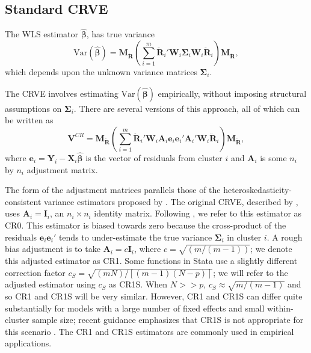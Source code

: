 \documentclass[12pt]{article}
\begin{document}
\hypertarget{standard-crve}{%
\subsection{Standard CRVE}\label{standard-crve}}

The WLS estimator \(\boldsymbol{\hat\beta}\), has true variance
\begin{equation}
\label{eq:var_WLS}
\text{Var}\left(\boldsymbol{\hat\beta}\right) = \mathbf{M_{\ddot{R}}}\left(\sum_{i=1}^m \mathbf{\ddot{R}}_i' \mathbf{W}_i \boldsymbol\Sigma_i \mathbf{W}_i\mathbf{\ddot{R}}_i\right) \mathbf{M_{\ddot{R}}},
\end{equation} which depends upon the unknown variance matrices
\(\boldsymbol\Sigma_i\).

The CRVE involves estimating
\(\text{Var}\left(\boldsymbol{\hat\beta}\right)\) empirically, without
imposing structural assumptions on \(\boldsymbol\Sigma_i\). There are
several versions of this approach, all of which can be written as
\begin{equation}
\label{eq:V_small}
\mathbf{V}^{CR} = \mathbf{M_{\ddot{R}}}\left(\sum_{i=1}^m \mathbf{\ddot{R}}_i'\mathbf{W}_i \mathbf{A}_i \mathbf{e}_i \mathbf{e}_i' \mathbf{A}_i' \mathbf{W}_i \mathbf{\ddot{R}}_i\right) \mathbf{M_{\ddot{R}}},
\end{equation} where
\(\mathbf{e}_i = \mathbf{Y}_i - \mathbf{X}_i \boldsymbol{\hat\beta}\) is
the vector of residuals from cluster \(i\) and \(\mathbf{A}_i\) is some
\(n_i\) by \(n_i\) adjustment matrix.

The form of the adjustment matrices parallels those of the
heteroskedasticity-consistent variance estimators proposed by
\citet{MacKinnon1985some}. The original CRVE, described by
\citet{Liang1986longitudinal}, uses \(\mathbf{A}_i = \mathbf{I}_i\), an
\(n_i \times n_i\) identity matrix. Following
\citet{Cameron2015practitioners}, we refer to this estimator as CR0.
This estimator is biased towards zero because the cross-product of the
residuals \(\mathbf{e}_i \mathbf{e}_i'\) tends to under-estimate the
true variance \(\boldsymbol\Sigma_i\) in cluster \(i\). A rough bias
adjustment is to take \(\mathbf{A}_i = c\mathbf{I}_i\), where
\(c = \sqrt{(m/(m-1))}\); we denote this adjusted estimator as CR1. Some
functions in Stata use a slightly different correction factor
\(c_S = \sqrt{(m N)/[(m - 1)(N - p)]}\); we will refer to the adjusted
estimator using \(c_S\) as CR1S. When \(N >> p\),
\(c_S \approx \sqrt{m/(m-1)}\) and so CR1 and CR1S will be very similar.
However, CR1 and CR1S can differ quite substantially for models with a
large number of fixed effects and small within-cluster sample size;
recent guidance emphasizes that CR1S is not appropriate for this
scenario \citet{Cameron2015practitioners}. The CR1 and CR1S estimators
are commonly used in empirical applications.
\end{document}

